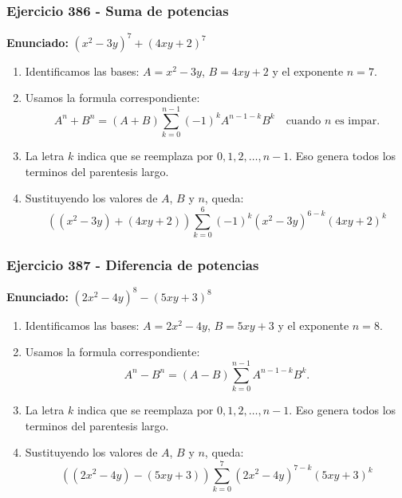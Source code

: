 \documentclass[11pt,a4paper]{article}
\begin{document}
\subsubsection*{Ejercicio 386 - Suma de potencias}
\textbf{Enunciado:} $ \left(x^{2} - 3 y\right)^{7}+\left(4 x y + 2\right)^{7} $\par
\begin{enumerate}[leftmargin=2em]
\item Identificamos las bases: \(A=x^{2} - 3 y\), \(B=4 x y + 2\) y el exponente \(n=7\).
\item Usamos la formula correspondiente: \[A^n+B^n=(A+B)\sum_{k=0}^{n-1}(-1)^kA^{n-1-k}B^k\quad\text{cuando }n\text{ es impar}.\]
\item La letra \(k\) indica que se reemplaza por \(0,1,2,\ldots,n-1\). Eso genera todos los terminos del parentesis largo.
\item Sustituyendo los valores de \(A\), \(B\) y \(n\), queda: \[\boxed{\left(\left(x^{2} - 3 y\right)+\left(4 x y + 2\right)\right)\sum_{k=0}^{6}(-1)^k\left(x^{2} - 3 y\right)^{6-k}\left(4 x y + 2\right)^k}\]
\end{enumerate}

\vspace{0.2cm}
\subsubsection*{Ejercicio 387 - Diferencia de potencias}
\textbf{Enunciado:} $ \left(2 x^{2} - 4 y\right)^{8}-\left(5 x y + 3\right)^{8} $\par
\begin{enumerate}[leftmargin=2em]
\item Identificamos las bases: \(A=2 x^{2} - 4 y\), \(B=5 x y + 3\) y el exponente \(n=8\).
\item Usamos la formula correspondiente: \[A^n-B^n=(A-B)\sum_{k=0}^{n-1}A^{n-1-k}B^k.\]
\item La letra \(k\) indica que se reemplaza por \(0,1,2,\ldots,n-1\). Eso genera todos los terminos del parentesis largo.
\item Sustituyendo los valores de \(A\), \(B\) y \(n\), queda: \[\boxed{\left(\left(2 x^{2} - 4 y\right)-\left(5 x y + 3\right)\right)\sum_{k=0}^{7}\left(2 x^{2} - 4 y\right)^{7-k}\left(5 x y + 3\right)^k}\]
\end{enumerate}

\vspace{0.2cm}
\end{document}
